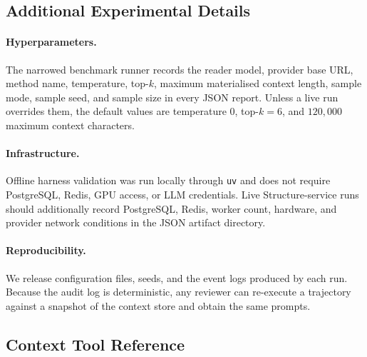 \subsection{Additional Experimental Details}

\paragraph{Hyperparameters.} The narrowed benchmark runner records
the reader model, provider base URL, method name, temperature, top-$k$,
maximum materialised context length, sample mode, sample seed, and
sample size in every JSON report. Unless a live run overrides them,
the default values are temperature $0$, top-$k=6$, and
$120{,}000$ maximum context characters.

\paragraph{Infrastructure.} Offline harness validation was run locally
through \texttt{uv} and does not require PostgreSQL, Redis, GPU access,
or LLM credentials. Live Structure-service runs should additionally
record PostgreSQL, Redis, worker count, hardware, and provider network
conditions in the JSON artifact directory.

\paragraph{Reproducibility.} We release configuration files, seeds,
and the event logs produced by each run. Because the audit log is
deterministic, any reviewer can re-execute a trajectory against a
snapshot of the context store and obtain the same prompts.

\subsection{Context Tool Reference}


